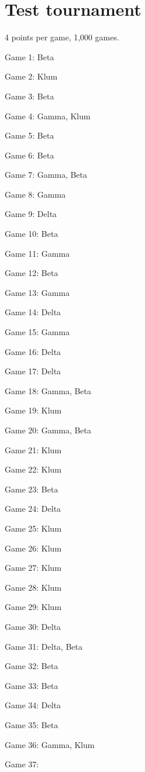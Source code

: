 \documentclass{article}
\begin{document}
\section{Test tournament}
4 points per game, 1,000 games.
\begin{multicols}{3}\raggedcolumns
\begin{compactitem}
\item Game 1:
Beta
\item Game 2:
Klum
\item Game 3:
Beta
\item Game 4:
Gamma, Klum
\item Game 5:
Beta
\item Game 6:
Beta
\item Game 7:
Gamma, Beta
\item Game 8:
Gamma
\item Game 9:
Delta
\item Game 10:
Beta
\item Game 11:
Gamma
\item Game 12:
Beta
\item Game 13:
Gamma
\item Game 14:
Delta
\item Game 15:
Gamma
\item Game 16:
Delta
\item Game 17:
Delta
\item Game 18:
Gamma, Beta
\item Game 19:
Klum
\item Game 20:
Gamma, Beta
\item Game 21:
Klum
\item Game 22:
Klum
\item Game 23:
Beta
\item Game 24:
Delta
\item Game 25:
Klum
\item Game 26:
Klum
\item Game 27:
Klum
\item Game 28:
Klum
\item Game 29:
Klum
\item Game 30:
Delta
\item Game 31:
Delta, Beta
\item Game 32:
Beta
\item Game 33:
Beta
\item Game 34:
Delta
\item Game 35:
Beta
\item Game 36:
Gamma, Klum
\item Game 37:

\end{compactitem}
\end{multicols}
\end{document}
